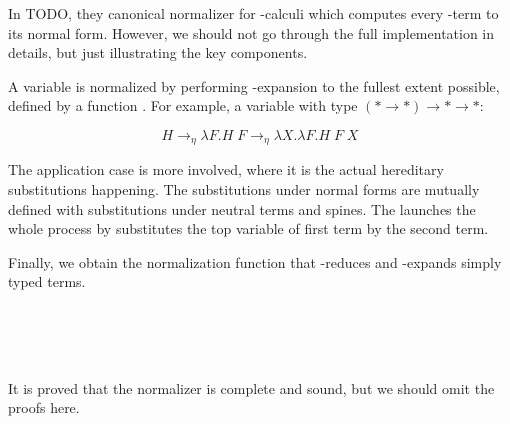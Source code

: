 {In TODO, they canonical normalizer for \lambda-calculi which computes every \lambda-term to its normal form. However, we should not go through the full implementation in details, but just illustrating the key components.

A variable is normalized by performing \eta-expansion to the fullest extent possible, defined by a function . For example, a variable with type $(* \to *) \to * \to *$:

\[ H \rightarrow_{\eta} \lambda F. H\;F \rightarrow_{\eta} \lambda X. \lambda F. H\;F\;X \]

The application case is more involved, where it is the actual hereditary substitutions happening. The substitutions under normal forms are mutually defined with substitutions under neutral terms and spines. The  launches the whole process by substitutes the top variable of first term by the second term.

Finally, we obtain the normalization function that \beta-reduces and \eta-expands simply typed terms.

\begin{code}%
\>[0]\AgdaSpace{}%
\AgdaSymbol{:}\AgdaSpace{}%
\AgdaSpace{}%
\AgdaSpace{}%
\AgdaSpace{}%
\AgdaSpace{}%
\AgdaSpace{}%
\AgdaSpace{}%
\<%
\\
\>[0]\AgdaSpace{}%
\AgdaSymbol{(}\AgdaSpace{}%
\AgdaSymbol{)}\AgdaSpace{}%
\AgdaSymbol{=}\AgdaSpace{}%
\AgdaSpace{}%
\<%
\\
\>[0]\AgdaSpace{}%
\AgdaSymbol{(}\AgdaSpace{}%
\AgdaSymbol{)}\AgdaSpace{}%
\AgdaSymbol{=}\AgdaSpace{}%
\AgdaSpace{}%
\AgdaSymbol{(}\AgdaSpace{}%
\AgdaSymbol{)}\<%
\\
\>[0]\AgdaSpace{}%
\AgdaSymbol{(}\AgdaSpace{}%
\AgdaSpace{}%
\AgdaSymbol{)}\AgdaSpace{}%
\AgdaSymbol{=}\AgdaSpace{}%
\AgdaSpace{}%
\AgdaSymbol{(}\AgdaSpace{}%
\AgdaSymbol{)}\AgdaSpace{}%
\AgdaSymbol{(}\AgdaSpace{}%
\AgdaSymbol{)}\<%
\end{code}

It is proved that the normalizer is complete and sound, but we should omit the proofs here.

}
